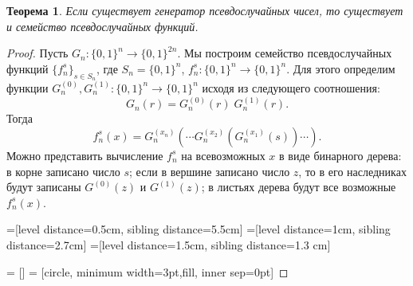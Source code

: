 \documentclass[12pt,a4paper]{article}
\newcommand{\bits}{\{0,1\}}
\theoremstyle{definition}
\theoremstyle{plain}
\newtheorem{theorem}{Теорема}[section]
\theoremstyle{remark}
\begin{document}
\begin{theorem}
Если существует генератор псевдослучайных чисел, то существует и семейство псевдослучайных функций.
\end{theorem}
\begin{proof}
Пусть $G_n:\bits^n\to\bits^{2n}$. Мы построим семейство псевдослучайных функций $\{f^s_n\}_{s\in S_n}$, где $S_n = \bits^n$, $f^s_n: \{0,1\}^n\to\{0,1\}^n$. Для этого определим функции $G_n^{(0)},G_n^{(1)}: \bits^n\to\bits^n$ исходя из следующего соотношения:  
$$G_n(r) = G_n^{(0)}(r)\; G_n^{(1)}(r).$$ Тогда  
$$f^s_n(x) = G_n^{(x_n)}(\dotsb G_n^{(x_2)}(G_n^{(x_1)}(s))  \dotsb).$$
Можно представить вычисление $f^s_n$ на всевозможных $x$ в виде бинарного дерева: 
в корне записано число $s$; если в вершине записано число $z$, то в его наследниках будут записаны $G^{(0)}(z)$ 
и $G^{(1)}(z)$; в листьях дерева будут все возможные $f^s_n(x)$.

=[level distance=0.5cm, sibling distance=5.5cm]
=[level distance=1cm, sibling distance=2.7cm]
=[level distance=1.5cm, sibling distance=1.3 cm]

 = []
 = [circle, minimum width=3pt,fill, inner sep=0pt]


\end{proof}
\end{document}
